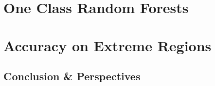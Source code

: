 \documentclass[draft]{ecsthesis}      %
\begin{document}
\part{One Class Random Forests}
\label{part:ocrf}


\part{Accuracy on Extreme Regions}\label{part:vect}



\chapter{Conclusion \& Perspectives}\label{chap:concl}


\appendix
%
%
\backmatter




\end{document}
